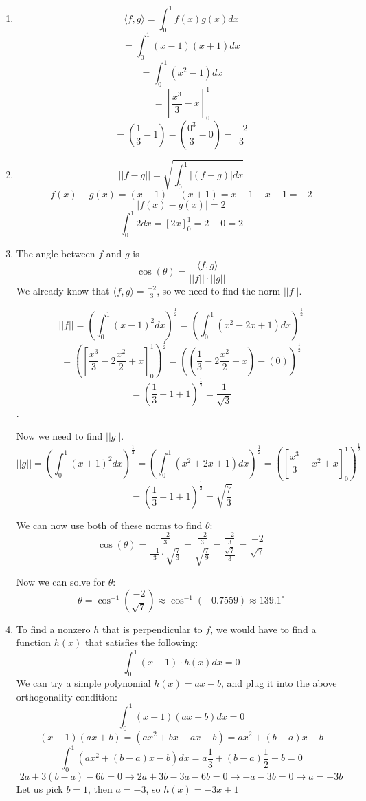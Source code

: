 \documentclass[12pt]{article}
\begin{document}
  \item
  \begin{enumerate}[leftmargin=!]
    \item
    \[ \langle f, g \rangle = \int_{0}^{1}f(x)g(x)dx\]
    \[ = \int_{0}^{1}(x-1)(x+1)dx\]
    \[ = \int_{0}^{1}(x^2-1)dx\]
    \[ = [\frac{x^3}{3} - x]^{1}_0\]
    \[ = (\frac{1}{3} - 1) - (\frac{0^3}{3} - 0) = \frac{-2}{3}\]
    \item
    \[ || f - g || = \sqrt{\int_{0}^{1}|(f-g)|dx}\]
    \[ f(x) - g(x) = (x-1) - (x+1) = x - 1 - x - 1 = -2\]
    \[ |f(x) - g(x)| = 2\]
    \[ \int_{0}^{1}2dx = [2x]^{1}_0 = 2 - 0 = 2\]
    \item
    The angle between $f$ and $g$ is
    \[ \cos(\theta) = \frac{\langle f, g \rangle}{||f|| \cdot ||g||}\]
    We already know that $\langle f, g \rangle = \frac{-2}{3}$, so we need to find the norm $||f||$.

    \[||f|| = (\int_{0}^{1}(x-1)^2dx)^{\frac{1}{2}} = (\int_{0}^{1}(x^2-2x+1)dx)^{\frac{1}{2}}\]
    \[ = ([\frac{x^3}{3}-2\frac{x^2}{2} + x]^1_0)^\frac{1}{2} = ((\frac{1}{3} - 2\frac{x^2}{2} + x) - (0))^\frac{1}{2}\]
    \[ = (\frac{1}{3} - 1 +1)^{\frac{1}{2}} = \frac{1}{\sqrt{3}}\].

    Now we need to find $||g||$.
    \[ ||g|| = (\int_{0}^{1}(x+1)^2dx)^{\frac{1}{2}} = (\int_{0}^{1}(x^2+2x+1)dx)^{\frac{1}{2}} = ([\frac{x^3}{3} + x^{2} + x]^{1}_0)^{\frac{1}{2}}\]
    \[ = (\frac{1}{3} + 1 + 1)^\frac{1}{2} = \sqrt{\frac{7}{3}}\]

    We can now use both of these norms to find $\theta$:
    \[ \cos(\theta) = \frac{\frac{-2}{3}}{\frac{-1}{3} \cdot \sqrt{\frac{7}{3}}} = \frac{\frac{-2}{3}}{\sqrt{\frac{7}{9}}} = \frac{\frac{-2}{3}}{\frac{\sqrt{7}}{3}} = \frac{-2}{\sqrt{7}}\]

    Now we can solve for $\theta$:
    \[\theta = \cos^{-1}(\frac{-2}{\sqrt{7}}) \approx \cos^{-1}(-0.7559) \approx 139.1^{\circ}\]
    \item
    To find a nonzero $h$ that is perpendicular to $f$, we would have to find a function $h(x)$ that satisfies the following:
    \[ \int_{0}^{1}(x-1) \cdot h(x) dx = 0\]
    We can try a simple polynomial $h(x) = ax + b$, and plug it into the above orthogonality condition:
    \[\int_{0}^{1}(x-1)(ax+b)dx = 0\]
    \[(x-1)(ax+b) = (ax^2+bx -ax - b) = ax^2 + (b-a)x - b\]
    \[\int_{0}^{1}(ax^2+(b-a)x-b)dx = a\frac{1}{3}+(b-a)\frac{1}{2}-b = 0\]
    \[2a+3(b-a) - 6b = 0 \rightarrow 2a+3b-3a-6b = 0 \rightarrow -a -3b = 0 \rightarrow a = -3b\]
    Let us pick $b=1$, then $a = -3$, so $h(x) = -3x+1$
  \end{enumerate}
\end{document}
